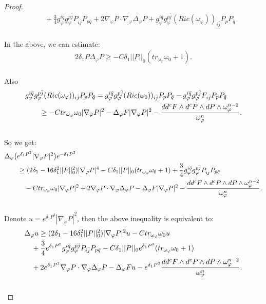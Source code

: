\documentclass[11pt]{amsart}
\numberwithin{equation}{section}
\begin{document}
\begin{proof}
\begin{align}
	&\quad +\frac{3}{4}g_{\varphi}^{i\bar{q}}g_{\varphi}^{p\bar{j}}P_{i\bar{j}}P_{p\bar{q}}+2\nabla_{\varphi}P\cdot \nabla_{\varphi}\Delta_{\varphi}P+g_{\varphi}^{i\bar{q}}g_{\varphi}^{p\bar{j}}(Ric(\omega_{\varphi}))_{i\bar{j}}P_pP_{\bar{q}} 
\end{align}\\
In the above,  we can estimate:
\begin{align}
	2\delta_1P\Delta_{\varphi}P\ge  -C\delta_1||P||_0 (tr_{\omega_{\varphi}}\omega_0+1).
\end{align}\\
Also
\begin{align}
	&g_{\varphi}^{i\bar{q}}g_{\varphi}^{p\bar{j}}(Ric(\omega_{\varphi}))_{i\bar{j}}P_pP_{\bar{q}} =g_{\varphi}^{i\bar{q}}g_{\varphi}^{p\bar{j}}(Ric(\omega_0))_{i\bar{j}}P_pP_{\bar{q}} - g_{\varphi}^{i\bar{q}}g_{\varphi}^{p\bar{j}}F_{i\bar{j}}P_pP_{\bar{q}} \notag \\
	&\qquad \ge  -C tr_{\omega_{\varphi}}\omega_0|\nabla_{\varphi}P|^2 - \Delta_{\varphi}F|\nabla_{\varphi}P|^2 - \frac{dd^cF\wedge d^c P\wedge d P\wedge \omega_{\varphi}^{n-2}}{\omega_{\varphi}^n}.
\end{align}\\
So we get:
\begin{align}
	&\Delta_{\varphi}\big(e^{\delta_1P^2}|\nabla_{\varphi}P|^2\big)e^{-\delta_1P^2} \notag\\
	&\qquad \ge  (2\delta_1-16\delta_1^2||P||_0^2) |\nabla_{\varphi}P|^4 -C\delta_1||P||_0 (tr_{\omega_{\varphi}}\omega_0+1)  +\frac{3}{4}g_{\varphi}^{i\bar{q}}g_{\varphi}^{p\bar{j}}P_{i\bar{j}}P_{p\bar{q}}   \notag \\
	&\qquad\quad -C tr_{\omega_{\varphi}}\omega_0|\nabla_{\varphi}P|^2 +2\nabla_{\varphi}P\cdot \nabla_{\varphi}\Delta_{\varphi}P - \Delta_{\varphi}F|\nabla_{\varphi}P|^2 - \frac{dd^cF\wedge d^cP\wedge dP\wedge \omega_{\varphi}^{n-2}}{\omega_{\varphi}^n}.
\end{align}\\
Denote $u=e^{\delta_1 P^2}|\nabla_{\varphi}P|^2$,  then the above inequality is equivalent to:
\begin{align}
	&\Delta_{\varphi}u \notag \ge  (2\delta_1-16\delta_1^2||P||_0^2) |\nabla_{\varphi}P|^2u -Ctr_{\omega_{\varphi}}\omega_0 u \notag\\
	&\quad  + \frac{3}{4} e^{\delta_1P^2}g_{\varphi}^{i\bar{q}}g_{\varphi}^{p\bar{j}}P_{i\bar{j}}P_{p\bar{q}} - C\delta_1||P||_0e^{\delta_1P^2}(tr_{\omega_{\varphi}}\omega_0 +1)  \notag \\
	&\quad+2e^{\delta_1P^2}\nabla_{\varphi}P\cdot\nabla_{\varphi}\Delta_{\varphi}P - \Delta_{\varphi}Fu - e^{\delta_1P^2}\frac{dd^cF\wedge d^cP\wedge dP\wedge \omega_{\varphi}^{n-2}}{\omega_{\varphi}^n}.
\end{align}\\


\end{proof}
\end{document}
